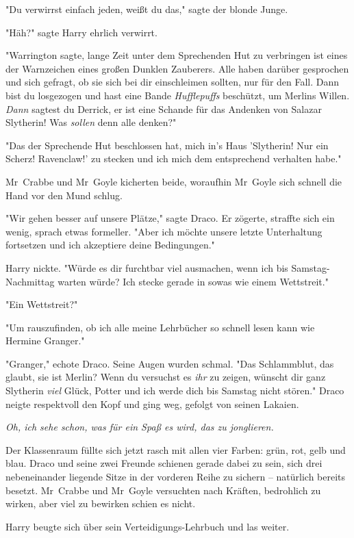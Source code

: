 {"Du verwirrst einfach jeden, weißt du das," sagte der blonde Junge.

"Häh?" sagte Harry ehrlich verwirrt.

"Warrington sagte, lange Zeit unter dem Sprechenden Hut zu verbringen ist eines der Warnzeichen eines großen Dunklen Zauberers. Alle haben darüber gesprochen und sich gefragt, ob sie sich bei dir einschleimen sollten, nur für den Fall. Dann bist du losgezogen und hast eine Bande \emph{Hufflepuffs} beschützt, um Merlins Willen. \emph{Dann} sagtest du Derrick, er ist eine Schande für das Andenken von Salazar Slytherin! Was \emph{sollen} denn alle denken?"

"Das der Sprechende Hut beschlossen hat, mich in's Haus 'Slytherin! Nur ein Scherz! Ravenclaw!' zu stecken und ich mich dem entsprechend verhalten habe."

Mr~Crabbe und Mr~Goyle kicherten beide, woraufhin Mr~Goyle sich schnell die Hand vor den Mund schlug.

"Wir gehen besser auf unsere Plätze," sagte Draco. Er zögerte, straffte sich ein wenig, sprach etwas formeller. "Aber ich möchte unsere letzte Unterhaltung fortsetzen und ich akzeptiere deine Bedingungen."

Harry nickte. "Würde es dir furchtbar viel ausmachen, wenn ich bis Samstag-Nachmittag warten würde? Ich stecke gerade in sowas wie einem Wettstreit."

"Ein Wettstreit?"

"Um rauszufinden, ob ich alle meine Lehrbücher so schnell lesen kann wie Hermine Granger."

"Granger," echote Draco. Seine Augen wurden schmal. "Das Schlammblut, das glaubt, sie ist Merlin? Wenn du versuchst es \emph{ihr} zu zeigen, wünscht dir ganz Slytherin \emph{viel} Glück, Potter und ich werde dich bis Samstag nicht stören." Draco neigte respektvoll den Kopf und ging weg, gefolgt von seinen Lakaien.

\emph{Oh, ich sehe schon, was für ein Spaß es wird, das zu jonglieren.}

Der Klassenraum füllte sich jetzt rasch mit allen vier Farben: grün, rot, gelb und blau. Draco und seine zwei Freunde schienen gerade dabei zu sein, sich drei nebeneinander liegende Sitze in der vorderen Reihe zu sichern -- natürlich bereits besetzt. Mr~Crabbe und Mr~Goyle versuchten nach Kräften, bedrohlich zu wirken, aber viel zu bewirken schien es nicht.

Harry beugte sich über sein Verteidigungs-Lehrbuch und las weiter.

}
